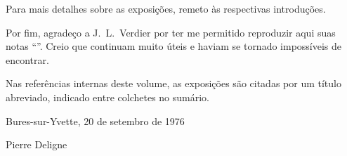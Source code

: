 Para mais detalhes sobre as exposições, remeto às respectivas introduções.

Por fim, agradeço a J.~L.~Verdier por ter me permitido reproduzir aqui suas
notas ``''. Creio que continuam muito úteis e haviam se tornado
impossíveis de encontrar.

Nas referências internas deste volume, as exposições são citadas por um
título abreviado, indicado entre colchetes no sumário.

\vspace{20pt}
\begin{flushright}
Bures-sur-Yvette, 20 de setembro de 1976

\vspace{5pt}
Pierre Deligne
\end{flushright}
